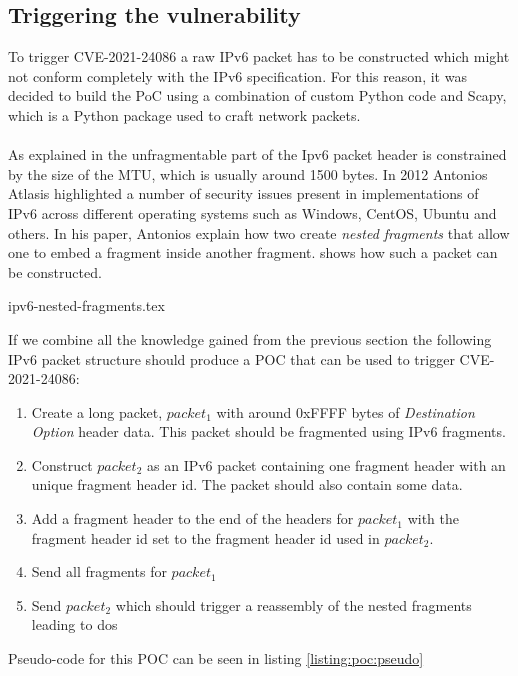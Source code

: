 \documentclass{report}
\begin{document}
\subsection{Triggering the vulnerability}
\label{cve-2021-24086:triggering}
To trigger CVE-2021-24086 a raw IPv6 packet has to be constructed which might not conform completely with the IPv6 specification. For this reason, it was decided to build the PoC using a combination of custom Python code and Scapy\cite{url:ipv6:scapy}, which is a Python package used to craft network packets.
\\
\\
As explained in  the unfragmentable part of the Ipv6 packet header is constrained by the size of the MTU, which is usually around 1500 bytes. In 2012 Antonios Atlasis highlighted a number of security issues present in implementations of IPv6 across different operating systems such as Windows, CentOS, Ubuntu and others\cite{url:ipv6:abusing-ipv6}. In his paper, Antonios explain how two create \emph{nested fragments} that allow one to embed a fragment inside another fragment.  shows how such a packet can be constructed.

{ipv6-nested-fragments.tex}

If we combine all the knowledge gained from the previous section the following IPv6 packet structure should produce a \gls{POC} that can be used to trigger CVE-2021-24086:

\begin{enumerate}
    \item Create a long packet, $packet_1$ with around 0xFFFF bytes of \emph{Destination Option} header data. This packet should be fragmented using IPv6 fragments.
    \item Construct $packet_2$ as an IPv6 packet containing one fragment header with an unique fragment header id. The packet should also contain some data.
    \item Add a fragment header to the end of the headers for $packet_1$ with the fragment header id set to the fragment header id used in $packet_2$.
    \item Send all fragments for $packet_1$
    \item Send $packet_2$ which should trigger a reassembly of the nested fragments leading to \gls{dos}
\end{enumerate}

Pseudo-code for this \gls{POC} can be seen in listing \ref{listing:poc:pseudo}
\end{document}
